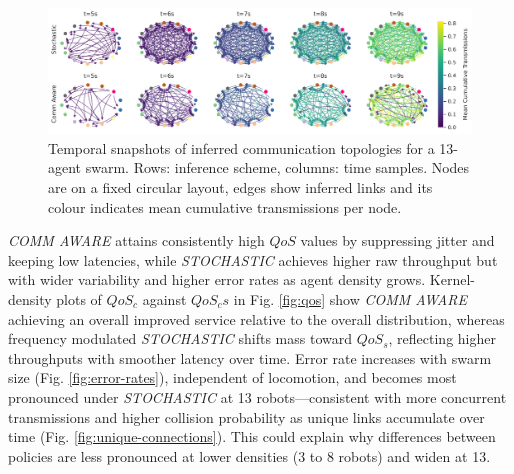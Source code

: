 \documentclass[conference]{IEEEtran}
\begin{document}
\begin{figure}[h]
    \centering
    \includegraphics[width=1\textwidth]{convergence_impact.pdf}
    \caption{Temporal snapshots of inferred communication topologies for a 13-agent swarm. Rows: inference scheme, columns: time samples. Nodes are on a fixed circular layout, edges show inferred links and its colour indicates mean cumulative transmissions per node.}
    \label{fig:convergence}
\end{figure}

\emph{COMM AWARE} attains consistently high $QoS$ values by suppressing jitter and keeping low latencies, while \emph{STOCHASTIC} achieves higher raw throughput but with wider variability and higher error rates as agent density grows. Kernel-density plots of $QoS_c$ against $QoS_cs$ in Fig. \ref{fig:qos} show \emph{COMM AWARE} achieving an overall improved service relative to the overall distribution, whereas frequency modulated \emph{STOCHASTIC} shifts mass toward $QoS_s$, reflecting higher throughputs with smoother latency over time.
Error rate increases with swarm size (Fig. \ref{fig:error-rates}), independent of locomotion, and becomes most pronounced under \emph{STOCHASTIC} at 13 robots—consistent with more concurrent transmissions and higher collision probability as unique links accumulate over time (Fig. \ref{fig:unique-connections}). This could explain why differences between policies are less pronounced at lower densities (3 to 8 robots) and widen at 13.\\

\end{document}
